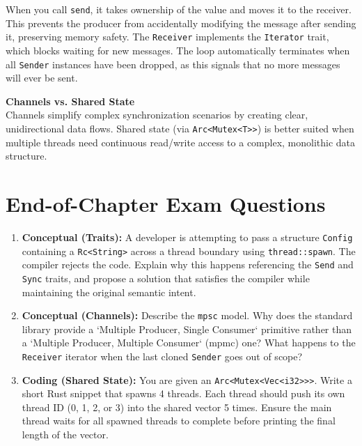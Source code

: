 When you call \texttt{send}, it takes ownership of the value and moves it to the receiver. This prevents the producer from accidentally modifying the message after sending it, preserving memory safety. The \texttt{Receiver} implements the \texttt{Iterator} trait, which blocks waiting for new messages. The loop automatically terminates when all \texttt{Sender} instances have been dropped, as this signals that no more messages will ever be sent.

\begin{insightbox}
\textbf{Channels vs. Shared State} \\
Channels simplify complex synchronization scenarios by creating clear, unidirectional data flows. Shared state (via \texttt{Arc<Mutex<T>>}) is better suited when multiple threads need continuous read/write access to a complex, monolithic data structure.
\end{insightbox}

\section*{End-of-Chapter Exam Questions}

\begin{enumerate}
    \item \textbf{Conceptual (Traits):} A developer is attempting to pass a structure \texttt{Config} containing a \texttt{Rc<String>} across a thread boundary using \texttt{thread::spawn}. The compiler rejects the code. Explain why this happens referencing the \texttt{Send} and \texttt{Sync} traits, and propose a solution that satisfies the compiler while maintaining the original semantic intent.
    
    \item \textbf{Conceptual (Channels):} Describe the \texttt{mpsc} model. Why does the standard library provide a `Multiple Producer, Single Consumer` primitive rather than a `Multiple Producer, Multiple Consumer` (mpmc) one? What happens to the \texttt{Receiver} iterator when the last cloned \texttt{Sender} goes out of scope?
    
    \item \textbf{Coding (Shared State):} You are given an \texttt{Arc<Mutex<Vec<i32>>>}. Write a short Rust snippet that spawns 4 threads. Each thread should push its own thread ID (0, 1, 2, or 3) into the shared vector 5 times. Ensure the main thread waits for all spawned threads to complete before printing the final length of the vector.
\end{enumerate}
